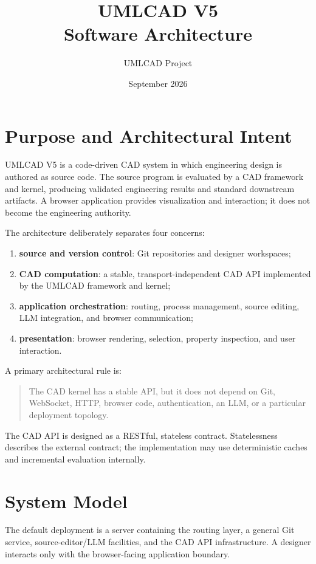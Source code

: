 \documentclass[11pt,a4paper]{article}
\title{UMLCAD V5\\Software Architecture}
\author{UMLCAD Project}
\date{September 2026}
\begin{document}
\maketitle
\tableofcontents
\newpage

\section{Purpose and Architectural Intent}

UMLCAD V5 is a code-driven CAD system in which engineering design is authored as source code. The source program is evaluated by a CAD framework and kernel, producing validated engineering results and standard downstream artifacts. A browser application provides visualization and interaction; it does not become the engineering authority.

The architecture deliberately separates four concerns:
\begin{enumerate}
    \item \textbf{source and version control}: Git repositories and designer workspaces;
    \item \textbf{CAD computation}: a stable, transport-independent CAD API implemented by the UMLCAD framework and kernel;
    \item \textbf{application orchestration}: routing, process management, source editing, LLM integration, and browser communication;
    \item \textbf{presentation}: browser rendering, selection, property inspection, and user interaction.
\end{enumerate}

A primary architectural rule is:

\begin{quote}
The CAD kernel has a stable API, but it does not depend on Git, WebSocket, HTTP, browser code, authentication, an LLM, or a particular deployment topology.
\end{quote}

The CAD API is designed as a RESTful, stateless contract. Statelessness describes the external contract; the implementation may use deterministic caches and incremental evaluation internally.

\section{System Model}

The default deployment is a server containing the routing layer, a general Git service, source-editor/LLM facilities, and the CAD API infrastructure. A designer interacts only with the browser-facing application boundary.
\end{document}
